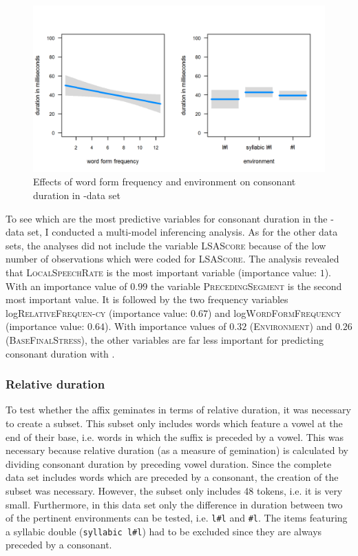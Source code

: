 \begin{figure} [t!]
	\centering

	\includegraphics[scale=.8] {images/Corpus/lyModelTransitionTypeAndFreq.png}
	\caption{Effects of word form frequency  and environment on consonant duration in -data set}
	\label{fig:corpus main effects  ly}
\end{figure}




To see which are the most predictive variables for consonant duration in the -data set, I conducted a multi-model inferencing analysis. As for the other data sets, the analyses did not include the variable \textsc{LSAScore} because of the low number of observations which were coded for \textsc{LSAScore}. The analysis revealed that \textsc{LocalSpeechRate} is the most important variable (importance value: $1$). With an importance value of $0.99$ the variable \textsc{PrecedingSegment} is the second most important value. It is followed by the two frequency variables log\textsc{RelativeFrequen-cy} (importance value: $0.67$) and log\textsc{WordFormFrequency} (importance value: $0.64$). With importance values of $0.32$ (\textsc{Environment}) and $0.26$ (\textsc{BaseFinalStress}), the other variables are far less important for predicting consonant duration with .


\subsubsection{Relative duration}

To test whether the affix  geminates in terms of relative duration, it was necessary to create a subset. This subset only includes words which feature a vowel at the end of their base, i.e. words in which the suffix is preceded by a vowel. This was necessary because relative duration (as a measure of gemination) is calculated by dividing consonant duration by preceding vowel duration. Since the complete data set includes words which are preceded by a consonant, the creation of the subset was necessary.
However, the subset only includes 48 tokens, i.e. it is very small. Furthermore, in this data set only the difference in duration between two of the pertinent environments can be tested, i.e. \texttt{l\#l} and \texttt{\#l}. The items featuring a syllabic double (\texttt{syllabic l\#l}) had to be excluded since they are always preceded by a consonant. 

